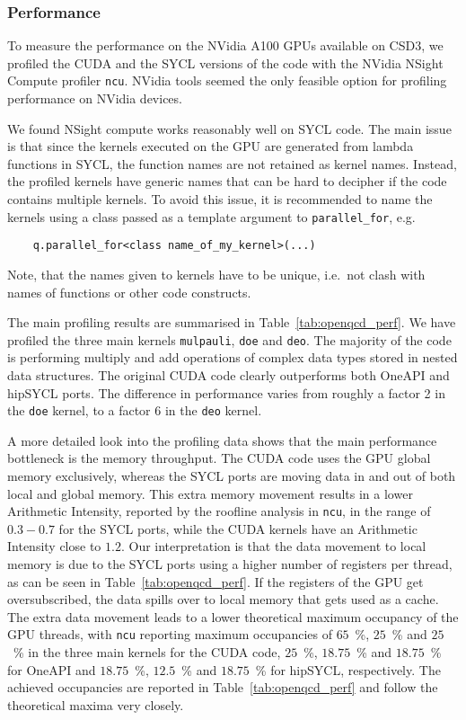 \documentclass[../main]{subfiles}
\begin{document}
\subsubsection{Performance}\label{sec:openqcd_performance}

To measure the performance on the NVidia A100 GPUs available on CSD3, we profiled the CUDA and the SYCL versions of the code with the NVidia NSight Compute profiler \texttt{ncu}.
NVidia tools seemed the only feasible option for profiling performance on NVidia devices.

We found NSight compute works reasonably well on SYCL code.
The main issue is that since the kernels executed on the GPU are generated from lambda functions in SYCL, the function names are not retained as kernel names.
Instead, the profiled kernels have generic names that can be hard to decipher if the code contains multiple kernels.
To avoid this issue, it is recommended to name the kernels using a class passed as a template argument to \verb #parallel_for#, e.g.
\begin{verbatim}
    q.parallel_for<class name_of_my_kernel>(...)
\end{verbatim}
Note, that the names given to kernels have to be unique, i.e.\ not clash with names of functions or other code constructs.

The main profiling results are summarised in Table~\ref{tab:openqcd_perf}.
We have profiled the three main kernels \texttt{mulpauli}, \texttt{doe} and \texttt{deo}.
The majority of the code is performing multiply and add operations of complex data types stored in nested data structures.
The original CUDA code clearly outperforms both OneAPI and hipSYCL ports.
The difference in performance varies from roughly a factor 2 in the \texttt{doe} kernel, to a factor 6 in the \texttt{deo} kernel.

A more detailed look into the profiling data shows that the main performance bottleneck is the memory throughput.
The CUDA code uses the GPU global memory exclusively, whereas the SYCL ports are moving data in and out of both local and global memory.
This extra memory movement results in a lower Arithmetic Intensity, reported by the roofline analysis in \texttt{ncu}, in the range of $0.3 - 0.7$ for the SYCL ports, while the CUDA kernels have an Arithmetic Intensity close to $1.2$.
Our interpretation is that the data movement to local memory is due to the SYCL ports using a higher number of registers per thread, as can be seen in Table~\ref{tab:openqcd_perf}.
If the registers of the GPU get oversubscribed, the data spills over to local memory that gets used as a cache.
The extra data movement leads to a lower theoretical maximum occupancy of the GPU threads, with \texttt{ncu} reporting maximum occupancies of $65$~\%, $25$~\% and $25$~\% in the three main kernels for the CUDA code, $25$~\%, $18.75$~\% and $18.75$~\% for OneAPI and $18.75$~\%, $12.5$~\% and $18.75$~\% for hipSYCL, respectively.
The achieved occupancies are reported in Table~\ref{tab:openqcd_perf} and follow the theoretical maxima very closely.
\end{document}
